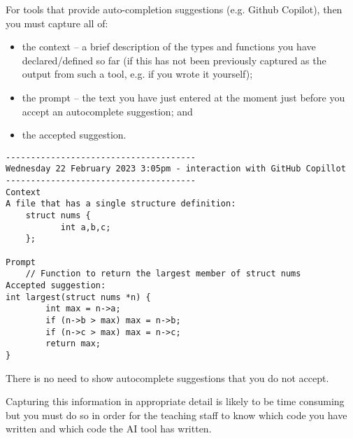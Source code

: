 \documentclass{article}
\begin{document}
For tools that provide auto-completion suggestions (e.g. Github Copilot), then you must capture all of:
\begin{itemize}
\item the context -- a brief description of the types and functions you have declared/defined so far (if this has not been
previously captured as the output from such a tool, e.g. if you wrote it yourself);
\item the prompt -- the text you have just entered at the moment just before you accept an autocomplete suggestion; and
\item the accepted suggestion.
\end{itemize}

\nolinenumbers
{}
\begin{lstlisting}
--------------------------------------
Wednesday 22 February 2023 3:05pm - interaction with GitHub Copillot
--------------------------------------
Context
A file that has a single structure definition:
	struct nums {
     	   int a,b,c;
	};

Prompt
	// Function to return the largest member of struct nums
Accepted suggestion:
int largest(struct nums *n) {
        int max = n->a;
        if (n->b > max) max = n->b;
        if (n->c > max) max = n->c;
        return max;
}
\end{lstlisting}
\linenumbers

There is no need to show autocomplete suggestions that you do not accept. 

Capturing this information in appropriate detail is likely to be time consuming but you must do so in order for the teaching staff to know which code you have written and which code the AI tool has written.
\end{document}
